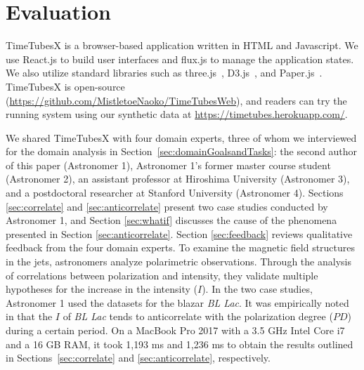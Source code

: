 \section{Evaluation\label{sec:evaluation}}
TimeTubesX is a browser-based application written in HTML and Javascript.
We use React.js to build user interfaces and flux.js to manage the application states.
We also utilize standard libraries such as three.js~\cite{three_framework}, D3.js~\cite{d3_framework}, and Paper.js~\cite{paper_framework}.
TimeTubesX is open-source (\url{https://github.com/MistletoeNaoko/TimeTubesWeb}), and 
readers can try the running system using our synthetic data at \url{https://timetubes.herokuapp.com/}.

We shared TimeTubesX with four domain experts, three of whom we interviewed for the domain analysis in Section~\ref{sec:domainGoalsandTasks}: the second author of this paper (Astronomer 1), Astronomer 1’s former master course student (Astronomer 2), an assistant professor at Hiroshima University (Astronomer 3), and a postdoctoral researcher at Stanford University (Astronomer 4). Sections \ref{sec:correlate} and \ref{sec:anticorrelate} present two case studies conducted by Astronomer 1, and Section \ref{sec:whatif} discusses the cause of the phenomena presented in Section \ref{sec:anticorrelate}. Section \ref{sec:feedback} reviews qualitative feedback from the four domain experts.
To examine the magnetic field structures in the jets, 
astronomers analyze polarimetric observations. 
Through the analysis of correlations between polarization and intensity, 
they validate multiple hypotheses for the increase in the intensity ($I$). 
In the two case studies, Astronomer 1 used the datasets for the blazar \emph{BL Lac}.
It was empirically noted in \cite{Gaur2014} that the $I$ of \emph{BL Lac} tends to anticorrelate with the polarization degree ($PD$) during a certain period.
On a MacBook Pro 2017 with a 3.5 GHz Intel Core i7 and a 16 GB RAM, it took 1{,}193 ms and 1{,}236 ms to obtain the results outlined in Sections~\ref{sec:correlate} and \ref{sec:anticorrelate}, respectively.

